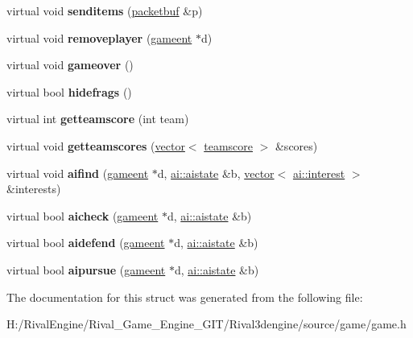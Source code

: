 \begin{DoxyCompactItemize}
\mbox{\label{structgame_1_1clientmode_af911531e1533abc04313785b874080e2}} 
virtual void {\bfseries senditems} (\hyperlink{structpacketbuf}{packetbuf} \&p)
\item 
\mbox{\label{structgame_1_1clientmode_ab84ceae05f9c8b687c657722e1ca1f26}} 
virtual void {\bfseries removeplayer} (\hyperlink{structgameent}{gameent} $\ast$d)
\item 
\mbox{\label{structgame_1_1clientmode_ad196dd3c0f9e609a5282c94b903d45ef}} 
virtual void {\bfseries gameover} ()
\item 
\mbox{\label{structgame_1_1clientmode_a1f1ef26efdef70b0976a99a5ad794b46}} 
virtual bool {\bfseries hidefrags} ()
\item 
\mbox{\label{structgame_1_1clientmode_aea5be25100da67d8263b0e144e324c64}} 
virtual int {\bfseries getteamscore} (int team)
\item 
\mbox{\label{structgame_1_1clientmode_afa7b0f23e0ac3446da71e3c90bb2fd46}} 
virtual void {\bfseries getteamscores} (\hyperlink{structvector}{vector}$<$ \hyperlink{structteamscore}{teamscore} $>$ \&scores)
\item 
\mbox{\label{structgame_1_1clientmode_a1efc58a0529fc0f54482034fe88a4349}} 
virtual void {\bfseries aifind} (\hyperlink{structgameent}{gameent} $\ast$d, \hyperlink{structai_1_1aistate}{ai\+::aistate} \&b, \hyperlink{structvector}{vector}$<$ \hyperlink{structai_1_1interest}{ai\+::interest} $>$ \&interests)
\item 
\mbox{\label{structgame_1_1clientmode_a7782032ba1254d274b29411769e4a9f8}} 
virtual bool {\bfseries aicheck} (\hyperlink{structgameent}{gameent} $\ast$d, \hyperlink{structai_1_1aistate}{ai\+::aistate} \&b)
\item 
\mbox{\label{structgame_1_1clientmode_a342fdb830ecf89adc4751a7a3dceac75}} 
virtual bool {\bfseries aidefend} (\hyperlink{structgameent}{gameent} $\ast$d, \hyperlink{structai_1_1aistate}{ai\+::aistate} \&b)
\item 
\mbox{\label{structgame_1_1clientmode_a1712443b96d442fe69afc076d0476561}} 
virtual bool {\bfseries aipursue} (\hyperlink{structgameent}{gameent} $\ast$d, \hyperlink{structai_1_1aistate}{ai\+::aistate} \&b)
\end{DoxyCompactItemize}


The documentation for this struct was generated from the following file\+:\begin{DoxyCompactItemize}
\item 
H\+:/\+Rival\+Engine/\+Rival\+\_\+\+Game\+\_\+\+Engine\+\_\+\+G\+I\+T/\+Rival3dengine/source/game/game.\+h\end{DoxyCompactItemize}
